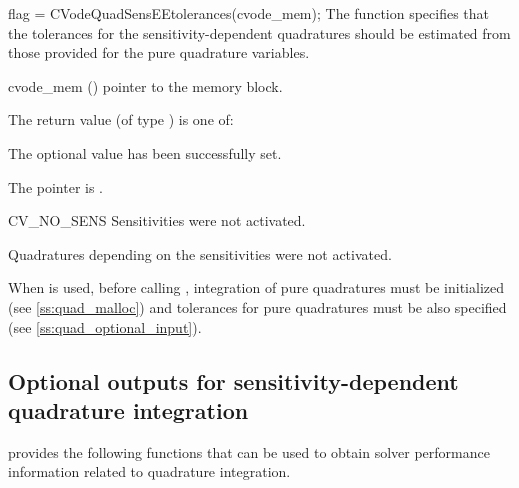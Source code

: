 {
  flag = CVodeQuadSensEEtolerances(cvode\_mem);
}
{
  The function  specifies that the tolerances for
  the sensitivity-dependent quadratures should be estimated from those provided for
  the pure quadrature variables. 
}
{
  \begin{args}
  \item[cvode\_mem] ()
    pointer to the {\cvodes} memory block.
  \end{args}
}
{
  The return value  (of type ) is one of:
  \begin{args}
  \item[\Id{CV\_SUCCESS}] 
    The optional value has been successfully set.
  \item[\Id{CVODE\_MEM\_NULL}]
    The  pointer is .
  \item[CV\_NO\_SENS]
    Sensitivities were not activated.
  \item[\Id{CV\_NO\_QUADSENS}] 
    Quadratures depending on the sensitivities were not activated.
  \end{args}
}
{ 
  When   is used, before calling , 
  integration of pure quadratures must be initialized (see \ref{ss:quad_malloc})
  and tolerances for pure quadratures must be also specified 
  (see \ref{ss:quad_optional_input}).
  
}


\subsection{Optional outputs for sensitivity-dependent quadrature integration}
\label{ss:quad_sens_optional_output}

{\cvodes} provides the following functions that can be used to obtain solver
performance information related to quadrature integration.

